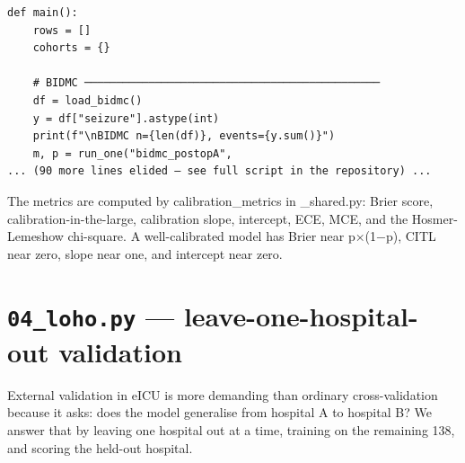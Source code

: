 \documentclass[11pt,a4paper]{article}
\begin{document}
\begin{lstlisting}[style=codeblock]
def main():
    rows = []
    cohorts = {}

    # BIDMC ──────────────────────────────────────────────
    df = load_bidmc()
    y = df["seizure"].astype(int)
    print(f"\nBIDMC n={len(df)}, events={y.sum()}")
    m, p = run_one("bidmc_postopA",
... (90 more lines elided — see full script in the repository) ...
\end{lstlisting}

The metrics are computed by calibration\_metrics in \_shared.py: Brier score, calibration-in-the-large, calibration slope, intercept, ECE, MCE, and the Hosmer-Lemeshow chi-square. A well-calibrated model has Brier near p×(1−p), CITL near zero, slope near one, and intercept near zero.
\clearpage
\section{\texttt{04\_loho.py} — leave-one-hospital-out validation}
External validation in eICU is more demanding than ordinary cross-validation because it asks: does the model generalise from hospital A to hospital B? We answer that by leaving one hospital out at a time, training on the remaining 138, and scoring the held-out hospital.
\end{document}
